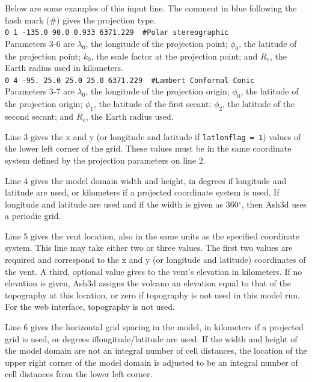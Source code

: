 \normalsize
Below are some examples of
this input line. The comment in blue following the hash mark (\#) gives
the projection type.\\
\texttt{0 1 -135.0 90.0 0.933 6371.229 {\color{blue} \#Polar stereographic}}\\
Parameters 3-6 are
$\lambda_0$, the longitude of the projection point;
$\phi_0$, the latitude of the projection point;
$k_0$, the scale factor at the projection point;
and $R_e$, the Earth radius used in kilometers.\\
\texttt{0 4 -95. 25.0 25.0 25.0 6371.229 {\color{blue} \#Lambert Conformal Conic}}\\
Parameters 3-7 are
$\lambda_0$, the longitude of the projection origin;
$\phi_0$, the latitude of the projection origin;
$\phi_1$, the latitude of the first secant;
$\phi_2$, the latitude of the second secant;
and $R_e$, the Earth radius used.

Line 3 gives the x and y (or longitude and latitude if \texttt{latlonflag = 1})
values of the lower
left corner of the grid. These values must be in the same coordinate system
defined by the projection parameters on line 2.

Line 4 gives the model domain width and height, in degrees if longitude and latitude
are used, or kilometers if a projected coordinate system is used.
If longitude and latitude are used and if the width is given as 360$^{\circ}$,
then Ash3d uses a periodic grid.

Line 5 gives the vent location, also in the same units as the specified
coordinate system. This line may take either two or three values. The first
two values are required and correspond to the x and y (or longitude and
latitude) coordinates of the vent. A third, optional value gives to the
vent’s elevation in
kilometers. If no elevation is given, Ash3d assigns the volcano an elevation
equal to that of the topography at this location, or zero if topography is
not used in this model run. For the web interface, topography is not used.

Line 6 gives the horizontal grid spacing in the model, in kilometers if a
projected grid is used, or degrees iflongitude/latitude are used. If the
width and height of the model domain are not an integral number of cell
distances, the location of the upper right corner of the model domain is
adjusted to be an integral number of cell distances from the lower left
corner.

